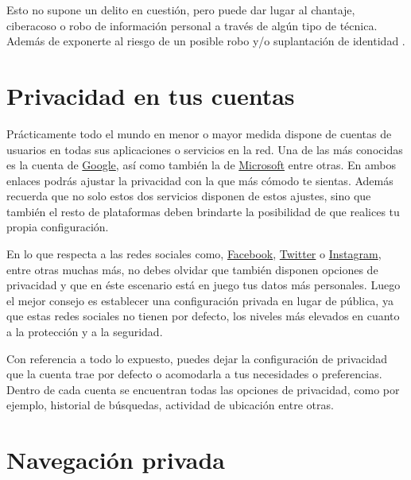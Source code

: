 \documentclass[
  spanish,
  a4paper,
  openany]{book}
\begin{document}
Esto no supone un delito en cuestión, pero puede dar lugar al chantaje, ciberacoso o robo de información personal a través de algún tipo de técnica. Además de exponerte al riesgo de un posible robo y/o suplantación de identidad \citep{AEPD-oversharing}.

\hypertarget{privacidad-en-tus-cuentas}{%
\section{Privacidad en tus cuentas}\label{privacidad-en-tus-cuentas}}

Prácticamente todo el mundo en menor o mayor medida dispone de cuentas de usuarios en todas sus aplicaciones o servicios en la red. Una de las más conocidas es la cuenta de \href{https://myaccount.google.com/data-and-personalization}{Google}, así como también la de \href{https://account.microsoft.com/account/privacy}{Microsoft} entre otras. En ambos enlaces podrás ajustar la privacidad con la que más cómodo te sientas. Además recuerda que no solo estos dos servicios disponen de estos ajustes, sino que también el resto de plataformas deben brindarte la posibilidad de que realices tu propia configuración.

En lo que respecta a las redes sociales como, \href{https://es-la.facebook.com/help/325807937506242}{Facebook}, \href{https://help.twitter.com/es/safety-and-security\#ads-and-data-privacy}{Twitter} o \href{https://es-es.facebook.com/help/instagram/196883487377501/?helpref=hc_fnav\&bc\%5B0\%5D=Ayuda\%20de\%20Instagram\&bc\%5B1\%5D=Administrar\%20tu\%20cuenta}{Instagram}, entre otras muchas más, no debes olvidar que también disponen opciones de privacidad y que en éste escenario está en juego tus datos más personales. Luego el mejor consejo es establecer una configuración privada en lugar de pública, ya que estas redes sociales no tienen por defecto, los niveles más elevados en cuanto a la protección y a la seguridad.

Con referencia a todo lo expuesto, puedes dejar la configuración de privacidad que la cuenta trae por defecto o acomodarla a tus necesidades o preferencias. Dentro de cada cuenta se encuentran todas las opciones de privacidad, como por ejemplo, historial de búsquedas, actividad de ubicación entre otras.

\hypertarget{navegaciuxf3n-privada}{%
\section{Navegación privada}\label{navegaciuxf3n-privada}}
\end{document}
